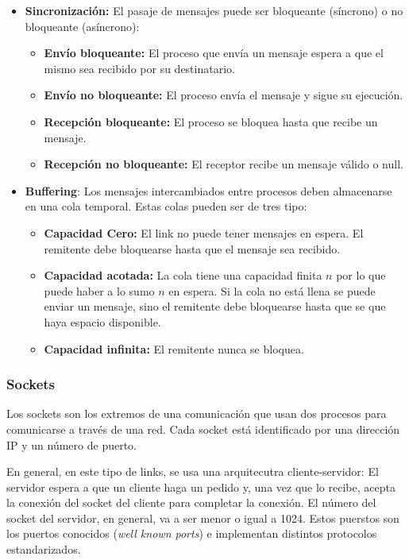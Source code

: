 \begin{itemize}
\begin{itemize}
	\end{itemize}
	\item \textbf{Sincronización:} El pasaje de mensajes puede ser bloqueante (síncrono) o no bloqueante (asíncrono):
	\begin{itemize}
		\item \textbf{Envío bloqueante:} El proceso que envía un mensaje espera a que el mismo sea recibido por su destinatario.
		\item \textbf{Envío no bloqueante:} El proceso envía el mensaje y sigue su ejecución.
		\item \textbf{Recepción bloqueante:} El proceso se bloquea hasta que recibe un mensaje.
		\item\textbf{Recepción no bloqueante:} El receptor recibe un mensaje válido o null.
	\end{itemize}
	\item \textbf{Buffering}: Los mensajes intercambiados entre procesos deben almacenarse en una cola temporal. Estas colas pueden ser de tres tipo:
	\begin{itemize}
		\item\textbf{Capacidad Cero:} El link no puede tener mensajes en espera. El remitente debe bloquearse hasta que el mensaje sea recibido.
		\item \textbf{Capacidad acotada:} La cola tiene una capacidad finita $n$ por lo que puede haber a lo sumo $n$ en espera. Si la cola no está llena se puede enviar un mensaje, sino el remitente debe bloquearse hasta que se que haya espacio disponible.
		\item \textbf{Capacidad infinita:} El remitente nunca se bloquea.
	\end{itemize}
\end{itemize}

\subsubsection{Sockets}
Los sockets son los extremos de una comunicación que usan dos procesos para comunicarse a través de una red. Cada socket está identificado por una dirección IP y un número de puerto. 	

En general, en este tipo de links, se usa una arquitecutra cliente-servidor: El servidor espera a que un cliente haga un pedido y, una vez que lo recibe, acepta la conexión del socket del cliente para completar la conexión. El número del socket del servidor, en general, va a ser menor o igual a 1024. Estos puerstos son los puertos conocidos (\textit{well known ports}) e implementan distintos protocolos estandarizados.

